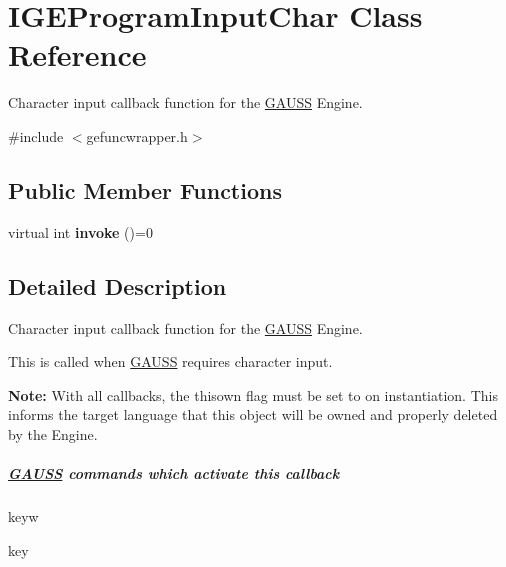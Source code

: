 \hypertarget{class_i_g_e_program_input_char}{}\section{I\+G\+E\+Program\+Input\+Char Class Reference}
\label{class_i_g_e_program_input_char}


Character input callback function for the \hyperlink{class_g_a_u_s_s}{G\+A\+U\+SS} Engine.  




{\ttfamily \#include $<$gefuncwrapper.\+h$>$}

\subsection*{Public Member Functions}
\begin{DoxyCompactItemize}
\item 
\mbox{\label{class_i_g_e_program_input_char_a598db017e0c0456b09e8a32f9f635d08}} 
virtual int {\bfseries invoke} ()=0
\end{DoxyCompactItemize}


\subsection{Detailed Description}
Character input callback function for the \hyperlink{class_g_a_u_s_s}{G\+A\+U\+SS} Engine. 

This is called when \hyperlink{class_g_a_u_s_s}{G\+A\+U\+SS} requires character input.

{\bfseries Note\+:} With all callbacks, the {\ttfamily thisown} flag must be set to {} on instantiation. This informs the target language that this object will be owned and properly deleted by the Engine.

\subparagraph*{\hyperlink{class_g_a_u_s_s}{G\+A\+U\+SS} commands which activate this callback}


\begin{DoxyItemize}
\item {\ttfamily keyw}
\item {\ttfamily key}
\end{DoxyItemize}

